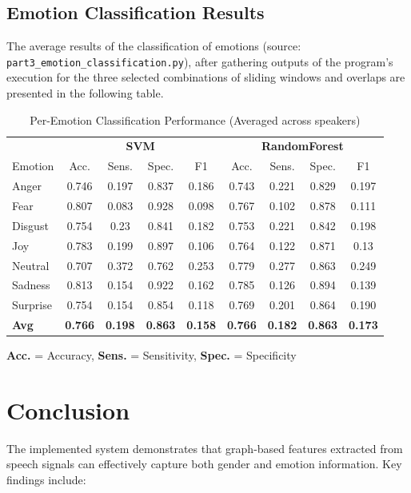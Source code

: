 \documentclass{article}
\begin{document}
\subsection{Emotion Classification Results}

The average results of the classification of 
emotions (source: \texttt{part3\_emotion\_classification.py}),
after gathering outputs of the program's execution for the three selected combinations 
of sliding windows and overlaps are presented in the following table.


\begin{table}[h]
\centering
\caption{Per-Emotion Classification Performance (Averaged across speakers)}
\label{tab:emotion_results}
\begin{tabular}{lcccccccc}
\toprule
 & \multicolumn{4}{c}{\textbf{SVM}} & \multicolumn{4}{c}{\textbf{RandomForest}} \\
\cmidrule(lr){2-5} \cmidrule(lr){6-9}
Emotion & Acc. & Sens. & Spec. & F1 & Acc. & Sens. & Spec. & F1 \\
\midrule
Anger & 0.746 & 0.197 & 0.837 & 0.186 & 0.743 & 0.221 & 0.829 & 0.197 \\
Fear & 0.807 & 0.083 & 0.928 & 0.098 & 0.767 & 0.102 & 0.878 & 0.111 \\
Disgust & 0.754 & 0.23 & 0.841 & 0.182 & 0.753 & 0.221 & 0.842 & 0.198 \\
Joy & 0.783 & 0.199 & 0.897 & 0.106 & 0.764 & 0.122 & 0.871 & 0.13 \\
Neutral & 0.707 & 0.372 & 0.762 & 0.253 & 0.779 & 0.277 & 0.863 & 0.249 \\
Sadness & 0.813 & 0.154 & 0.922 & 0.162 & 0.785 & 0.126 & 0.894 & 0.139 \\
Surprise & 0.754 & 0.154 & 0.854 & 0.118 & 0.769 & 0.201 & 0.864 & 0.190 \\
\midrule
\textbf{Avg} & \textbf{0.766} & \textbf{0.198} & \textbf{0.863} & \textbf{0.158} & \textbf{0.766} & \textbf{0.182} & \textbf{0.863} & \textbf{0.173} \\
\bottomrule
\end{tabular}

\vspace{0.2cm}
\footnotesize
\textbf{Acc.} = Accuracy, \textbf{Sens.} = Sensitivity, \textbf{Spec.} = Specificity
\end{table}








\section{Conclusion}
The implemented system demonstrates that graph-based features extracted from speech signals can effectively capture both gender and emotion information. Key findings include:
\end{document}
